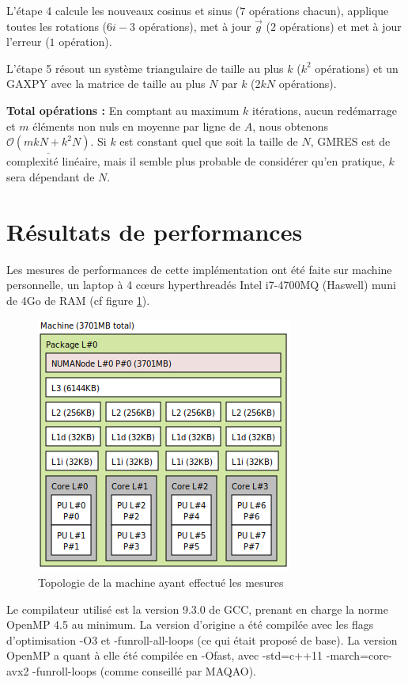 \documentclass[11pt,a4paper,oneside]{memoir}
\theoremstyle{definition}
\theoremstyle{remark}
\theoremstyle{plain}
\begin{document}
L'étape 4 calcule les nouveaux cosinus et sinus ($7$ opérations chacun), applique toutes les rotations ($6i-3$ opérations), met à jour $\vec{g}$ ($2$ opérations) et met à jour l'erreur ($1$ opération).

L'étape 5 résout un système triangulaire de taille au plus $k$ ($k^2$ opérations) et un GAXPY avec la matrice de taille au plus $N$ par $k$ ($2kN$ opérations).\bigskip

\textbf{Total opérations :} En comptant au maximum $k$ itérations, aucun redémarrage et $m$ éléments non nuls en moyenne par ligne de $A$, nous obtenons $\underline{\mathcal{O}(mkN+k^2 N)}$. Si $k$ est constant quel que soit la taille de $N$, GMRES est de complexité linéaire, mais il semble plus probable de considérer qu'en pratique, $k$ sera dépendant de $N$.




\section{Résultats de performances}

Les mesures de performances de cette implémentation ont été faite sur machine personnelle, un laptop  à 4 cœurs hyperthreadés Intel i7-4700MQ (Haswell) muni de 4Go de RAM (cf figure \ref{lstopo}).

\begin{figure}[!h]
\begin{center}
\includegraphics[scale=0.5]{Images-Rapport/lstopo.png}
\caption{Topologie de la machine ayant effectué les mesures}
\label{lstopo}
\end{center}
\end{figure}

Le compilateur utilisé est la version 9.3.0 de GCC, prenant en charge la norme OpenMP 4.5 au minimum. La version d'origine a été compilée avec les flags d'optimisation -O3 et -funroll-all-loops (ce qui était proposé de base). La version OpenMP a quant à elle été compilée en -Ofast, avec -std=c++11 -march=core-avx2 -funroll-loops (comme conseillé par MAQAO).
\end{document}
